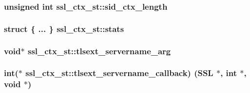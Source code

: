 \subsubsection[{\texorpdfstring{sid\+\_\+ctx\+\_\+length}{sid_ctx_length}}]{\setlength{\rightskip}{0pt plus 5cm}unsigned int ssl\+\_\+ctx\+\_\+st\+::sid\+\_\+ctx\+\_\+length}\hypertarget{structssl__ctx__st_a59afab8285fbc901d590ab6edaa75bd0}{}\label{structssl__ctx__st_a59afab8285fbc901d590ab6edaa75bd0}
\subsubsection[{\texorpdfstring{stats}{stats}}]{\setlength{\rightskip}{0pt plus 5cm}struct \{ ... \}   ssl\+\_\+ctx\+\_\+st\+::stats}\hypertarget{structssl__ctx__st_ae911318431bf3527133dbdb28443be3c}{}\label{structssl__ctx__st_ae911318431bf3527133dbdb28443be3c}
\subsubsection[{\texorpdfstring{tlsext\+\_\+servername\+\_\+arg}{tlsext_servername_arg}}]{\setlength{\rightskip}{0pt plus 5cm}void$\ast$ ssl\+\_\+ctx\+\_\+st\+::tlsext\+\_\+servername\+\_\+arg}\hypertarget{structssl__ctx__st_a2ab57baeccaab0b8d7ecc9c478f3ee14}{}\label{structssl__ctx__st_a2ab57baeccaab0b8d7ecc9c478f3ee14}
\subsubsection[{\texorpdfstring{tlsext\+\_\+servername\+\_\+callback}{tlsext_servername_callback}}]{\setlength{\rightskip}{0pt plus 5cm}int($\ast$ ssl\+\_\+ctx\+\_\+st\+::tlsext\+\_\+servername\+\_\+callback) ({\bf S\+SL} $\ast$, int $\ast$, void $\ast$)}\hypertarget{structssl__ctx__st_aa6c57ade4e374ba2092309192e700b45}{}\label{structssl__ctx__st_aa6c57ade4e374ba2092309192e700b45}
